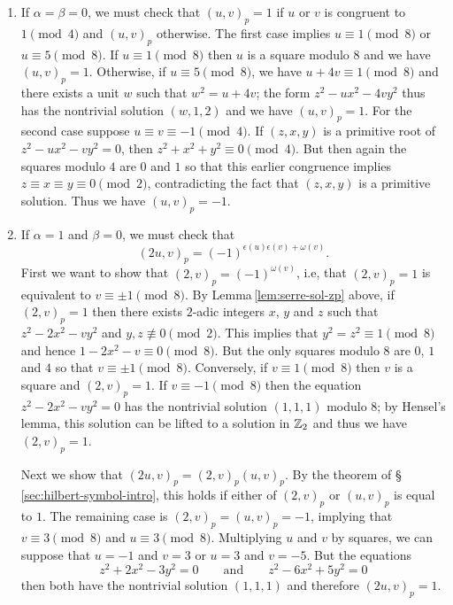 \begin{enumerate}[nosep, label=(\roman*), wide]
    \item If \(\alpha = \beta = 0\), we must check that \((u, v)_p = 1\) if \(u\) or \(v\) is congruent to \(1 \pmod{4}\) and \((u, v)_p\) otherwise. The first case implies \(u \equiv 1 \pmod{8}\) or \(u \equiv 5 \pmod{8}\). If \(u \equiv 1 \pmod{8}\) then \(u\) is a square modulo \(8\) and we have \((u, v)_p = 1\). Otherwise, if \(u \equiv 5 \pmod{8}\), we have \(u + 4v \equiv 1 \pmod{8}\) and there exists a unit \(w\) such that \(w^2 = u + 4v\); the form \(z^2 - ux^2 - 4vy^2\) thus has the nontrivial solution \((w, 1, 2)\) and we have \((u, v)_p = 1\). %
    For the second case suppose \(u \equiv v \equiv -1 \pmod{4}\). If \((z,x,y)\) is a primitive root of \(z^2 - ux^2 - vy^2 = 0\), then \(z^2 + x^2 + y^2 \equiv 0 \pmod{4}\). But then again the squares modulo \(4\) are \(0\) and \(1\) so that this earlier congruence implies \(z \equiv x \equiv y \equiv 0 \pmod{2}\), contradicting the fact that \((z, x, y)\) is a primitive solution. Thus we have \((u, v)_p = -1\).

    \item If \(\alpha = 1\) and \(\beta = 0\), we must check that
    \[ (2u, v)_p = (-1)^{\epsilon(u)\epsilon(v) + \omega(v)}. \]
    First we want to show that \((2, v)_p = (-1)^{\omega(v)}\), i.e, that \((2, v)_p = 1\) is equivalent to \(v \equiv \pm 1\pmod{8}\). By Lemma\,\ref{lem:serre-sol-zp} above, if \((2, v)_p = 1\) then there exists \(2\)-adic integers \(x\), \(y\) and \(z\) such that \(z^2 - 2x^2 - vy^2\) and \(y, z \not\equiv 0 \pmod{2}\). This implies that \(y^2 = z^2 \equiv 1 \pmod{8}\) and hence \(1 - 2x^2 - v \equiv 0 \pmod{8}\). But the only squares modulo \(8\) are \(0\), \(1\) and \(4\) so that \(v \equiv \pm 1 \pmod{8}\). Conversely, if \(v \equiv 1 \pmod{8}\) then \(v\) is a square and \((2, v)_p = 1\). If \(v \equiv -1 \pmod{8}\) then the equation \(z^2 - 2x^2 - vy^2 = 0\) has the nontrivial solution \((1, 1, 1)\) modulo \(8\); by Hensel's lemma, this solution can be lifted to a solution in \(\mathbb{Z}_2\) and thus we have \((2, v)_p = 1\).

    Next we show that \((2u, v)_p= (2, v)_p(u,v)_p\). By the theorem of \S\,\ref{sec:hilbert-symbol-intro}, this holds if either of \((2,v)_p\) or \((u, v)_p\) is equal to \(1\). The remaining case is \((2, v)_p = (u, v)_p = -1\), implying that \(v \equiv 3 \pmod{8}\) and \(u \equiv 3 \pmod{8}\). Multiplying \(u\) and \(v\) by squares, we can suppose that \(u = -1\) and \(v = 3\) or \(u = 3\) and \(v = -5\). But the equations
    \[
    z^2 + 2x^2 - 3y^2 = 0 \qquad \text{and} \qquad z^2 - 6x^2 + 5y^2 = 0
    \]
    then both have the nontrivial solution \((1, 1, 1)\) and therefore \((2u, v)_p = 1\).


\end{enumerate}
